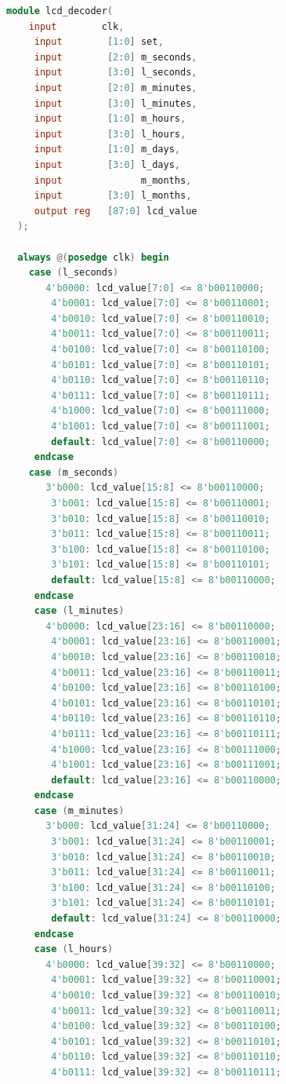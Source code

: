 \documentclass[12pt,a4paper,hidelinks]{article}            %
\begin{document}
\begin{lstlisting}[language=Verilog]
module lcd_decoder(
    input        clk,
     input        [1:0] set,
	 input        [2:0] m_seconds,
	 input        [3:0] l_seconds,
	 input        [2:0] m_minutes,
	 input        [3:0] l_minutes,
	 input        [1:0] m_hours,
	 input        [3:0] l_hours,
	 input        [1:0] m_days,
	 input        [3:0] l_days,
	 input              m_months,
	 input        [3:0] l_months,
	 output reg   [87:0] lcd_value
  );

  always @(posedge clk) begin
    case (l_seconds)
	   4'b0000: lcd_value[7:0] <= 8'b00110000;
		4'b0001: lcd_value[7:0] <= 8'b00110001;
		4'b0010: lcd_value[7:0] <= 8'b00110010;
		4'b0011: lcd_value[7:0] <= 8'b00110011;
		4'b0100: lcd_value[7:0] <= 8'b00110100;
		4'b0101: lcd_value[7:0] <= 8'b00110101;
		4'b0110: lcd_value[7:0] <= 8'b00110110;
		4'b0111: lcd_value[7:0] <= 8'b00110111;
		4'b1000: lcd_value[7:0] <= 8'b00111000;
		4'b1001: lcd_value[7:0] <= 8'b00111001;
		default: lcd_value[7:0] <= 8'b00110000;
	 endcase
    case (m_seconds)
	   3'b000: lcd_value[15:8] <= 8'b00110000;
		3'b001: lcd_value[15:8] <= 8'b00110001;
		3'b010: lcd_value[15:8] <= 8'b00110010;
		3'b011: lcd_value[15:8] <= 8'b00110011;
		3'b100: lcd_value[15:8] <= 8'b00110100;
		3'b101: lcd_value[15:8] <= 8'b00110101;
		default: lcd_value[15:8] <= 8'b00110000;
	 endcase
	 case (l_minutes)
	   4'b0000: lcd_value[23:16] <= 8'b00110000;
		4'b0001: lcd_value[23:16] <= 8'b00110001;
		4'b0010: lcd_value[23:16] <= 8'b00110010;
		4'b0011: lcd_value[23:16] <= 8'b00110011;
		4'b0100: lcd_value[23:16] <= 8'b00110100;
		4'b0101: lcd_value[23:16] <= 8'b00110101;
		4'b0110: lcd_value[23:16] <= 8'b00110110;
		4'b0111: lcd_value[23:16] <= 8'b00110111;
		4'b1000: lcd_value[23:16] <= 8'b00111000;
		4'b1001: lcd_value[23:16] <= 8'b00111001;
		default: lcd_value[23:16] <= 8'b00110000;
	 endcase
	 case (m_minutes)
	   3'b000: lcd_value[31:24] <= 8'b00110000;
		3'b001: lcd_value[31:24] <= 8'b00110001;
		3'b010: lcd_value[31:24] <= 8'b00110010;
		3'b011: lcd_value[31:24] <= 8'b00110011;
		3'b100: lcd_value[31:24] <= 8'b00110100;
		3'b101: lcd_value[31:24] <= 8'b00110101;
		default: lcd_value[31:24] <= 8'b00110000;
	 endcase
	 case (l_hours)
	   4'b0000: lcd_value[39:32] <= 8'b00110000;
		4'b0001: lcd_value[39:32] <= 8'b00110001;
		4'b0010: lcd_value[39:32] <= 8'b00110010;
		4'b0011: lcd_value[39:32] <= 8'b00110011;
		4'b0100: lcd_value[39:32] <= 8'b00110100;
		4'b0101: lcd_value[39:32] <= 8'b00110101;
		4'b0110: lcd_value[39:32] <= 8'b00110110;
		4'b0111: lcd_value[39:32] <= 8'b00110111;

\end{lstlisting}
\end{document}
